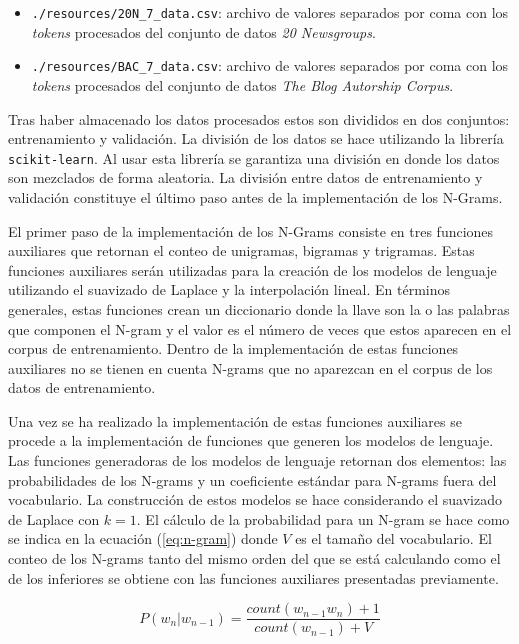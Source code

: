 \begin{itemize}
    \item \texttt{./resources/20N\_7\_data.csv}: archivo de valores separados por coma con los \textit{tokens} procesados del conjunto de datos \textit{20 Newsgroups}.
    \item \texttt{./resources/BAC\_7\_data.csv}: archivo de valores separados por coma con los \textit{tokens} procesados del conjunto de datos \textit{The Blog Autorship Corpus}.
\end{itemize}

Tras haber almacenado los datos procesados estos son divididos en dos conjuntos: entrenamiento y validación. La división de los datos se hace utilizando la librería \texttt{scikit-learn}. Al usar esta librería se garantiza una división en donde los datos son mezclados de forma aleatoria. La división entre datos de entrenamiento y validación constituye el último paso antes de la implementación de los N-Grams.

El primer paso de la implementación de los N-Grams consiste en tres funciones auxiliares que retornan el conteo de unigramas, bigramas y trigramas. Estas funciones auxiliares serán utilizadas para la creación de los modelos de lenguaje utilizando el suavizado de Laplace y la interpolación lineal. En términos generales, estas funciones crean un diccionario donde la llave son la o las palabras que componen el N-gram y el valor es el número de veces que estos aparecen en el corpus de entrenamiento. Dentro de la implementación de estas funciones auxiliares no se tienen en cuenta N-grams que no aparezcan en el corpus de los datos de entrenamiento.

Una vez se ha realizado la implementación de estas funciones auxiliares se procede a la implementación de funciones que generen los modelos de lenguaje. Las funciones generadoras de los modelos de lenguaje retornan dos elementos: las probabilidades de los N-grams y un coeficiente estándar para N-grams fuera del vocabulario. La construcción de estos modelos se hace considerando el suavizado de Laplace con $k=1$. El cálculo de la probabilidad para un N-gram se hace como se indica en la ecuación (\ref{eq:n-gram}) donde $V$ es el tamaño del vocabulario. El conteo de los N-grams tanto del mismo orden del que se está calculando como el de los inferiores se obtiene con las funciones auxiliares presentadas previamente.

\begin{equation}
    P(w_{n} | w_{n-1} ) = \frac{count(w_{n-1} w_n ) + 1}{count(w_{n-1}) + V}
    \label{eq:n-gram}
\end{equation}


